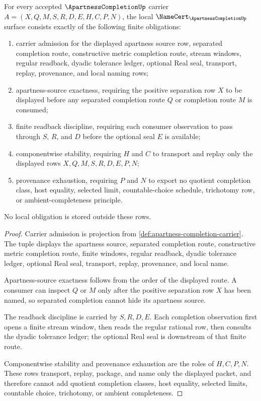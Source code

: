 \begin{theorem}
\label{thm:apartness-completion-namecert-obligations}
For every accepted $\ApartnessCompletionUp$ carrier $A=(X,Q,M,S,R,D,E,H,C,P,N)$, the local $\NameCert_{\ApartnessCompletionUp}$ surface consists exactly of the following finite obligations:
\begin{enumerate}
\item carrier admission for the displayed apartness source row, separated completion route, constructive metric completion route, stream windows, regular readback, dyadic tolerance ledger, optional Real seal, transport, replay, provenance, and local naming rows;
\item apartness-source exactness, requiring the positive separation row $X$ to be displayed before any separated completion route $Q$ or completion route $M$ is consumed;
\item finite readback discipline, requiring each consumer observation to pass through $S$, $R$, and $D$ before the optional seal $E$ is available;
\item componentwise stability, requiring $H$ and $C$ to transport and replay only the displayed rows $X,Q,M,S,R,D,E,P,N$;
\item provenance exhaustion, requiring $P$ and $N$ to export no quotient completion class, host equality, selected limit, countable-choice schedule, trichotomy row, or ambient-completeness principle.
\end{enumerate}
No local obligation is stored outside these rows.
\end{theorem}
\begin{proof}
Carrier admission is projection from \autoref{def:apartness-completion-carrier}. The tuple displays the apartness source, separated completion route, constructive metric completion route, finite windows, regular readback, dyadic tolerance ledger, optional Real seal, transport, replay, provenance, and local name.

Apartness-source exactness follows from the order of the displayed route. A consumer can inspect $Q$ or $M$ only after the positive separation row $X$ has been named, so separated completion cannot hide its apartness source.

The readback discipline is carried by $S,R,D,E$. Each completion observation first opens a finite stream window, then reads the regular rational row, then consults the dyadic tolerance ledger; the optional Real seal is downstream of that finite route.

Componentwise stability and provenance exhaustion are the roles of $H,C,P,N$. These rows transport, replay, package, and name only the displayed packet, and therefore cannot add quotient completion classes, host equality, selected limits, countable choice, trichotomy, or ambient completeness.
\end{proof}

